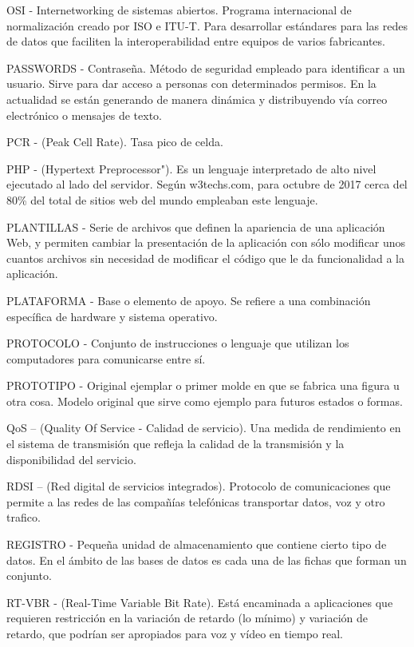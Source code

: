 OSI - Internetworking de sistemas abiertos. Programa internacional de normalización creado por ISO e ITU-T. Para desarrollar estándares para las redes de datos que faciliten la interoperabilidad entre equipos de varios fabricantes.

PASSWORDS - Contraseña. Método de seguridad empleado para identificar a un usuario. Sirve para dar acceso a personas con determinados permisos. En la actualidad se están generando de manera dinámica y distribuyendo vía correo electrónico o mensajes de texto.

PCR - (Peak Cell Rate). Tasa pico de celda.

PHP - (Hypertext Preprocessor"). Es un lenguaje interpretado de alto nivel ejecutado al lado del servidor. Según w3techs.com, para octubre de 2017 cerca del 80\% del total de sitios web del mundo empleaban este lenguaje.

PLANTILLAS -  Serie de archivos que definen la apariencia de una aplicación Web, y permiten cambiar la presentación de la aplicación con sólo modificar unos cuantos archivos sin necesidad de modificar el código que le da funcionalidad a la aplicación.

PLATAFORMA - Base o elemento de apoyo. Se refiere a una combinación específica de hardware y sistema operativo.

PROTOCOLO - Conjunto de instrucciones o lenguaje que utilizan los computadores para comunicarse entre sí.

PROTOTIPO - Original ejemplar o primer molde en que se fabrica una figura u otra cosa. Modelo original que sirve como ejemplo para futuros estados o formas.

QoS – (Quality Of Service - Calidad de servicio). Una medida de rendimiento en el sistema de transmisión que refleja la calidad de la transmisión y la disponibilidad del servicio.

RDSI – (Red digital de servicios integrados). Protocolo de comunicaciones que permite a las redes de las compañías telefónicas transportar datos, voz y otro trafico.

REGISTRO - Pequeña unidad de almacenamiento que contiene cierto tipo de datos. En el ámbito de las bases de datos es cada una de las fichas que forman un conjunto.

RT-VBR - (Real-Time Variable Bit Rate). Está encaminada a aplicaciones que requieren restricción en la variación de retardo (lo mínimo) y variación de retardo, que podrían ser apropiados para voz y vídeo en tiempo real.

